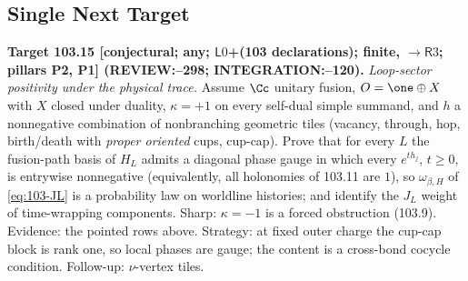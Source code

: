 \subsection{Single Next Target}

\textbf{Target 103.15 [conjectural; any; \(\mathsf L0\)+(103 declarations); finite, \(\to\mathsf R3\); pillars P2, P1] (REVIEW:--298; INTEGRATION:--120).}
\emph{Loop-sector positivity under the physical trace.} Assume \(\Cc\) unitary fusion, \(O=\one\oplus X\) with \(X\) closed under duality,
\(\kappa=+1\) on every self-dual simple summand, and \(h\) a nonnegative combination of nonbranching geometric tiles (vacancy, through,
hop, birth/death with \emph{proper oriented} cups, cup-cap). Prove that for every \(L\) the fusion-path basis of \(H_L\) admits a diagonal
phase gauge in which every \(e^{th_j}\), \(t\ge0\), is entrywise nonnegative (equivalently, all holonomies of 103.11 are \(1\)), so
\(\omega_{\beta,H}\) of \eqref{eq:103-JL} is a probability law on worldline histories; and identify the \(J_L\) weight of time-wrapping
components. Sharp: \(\kappa=-1\) is a forced obstruction (103.9). Evidence: the pointed rows above. Strategy: at fixed outer charge the
cup-cap block is rank one, so local phases are gauge; the content is a cross-bond cocycle condition. Follow-up: \(\nu\)-vertex tiles.
